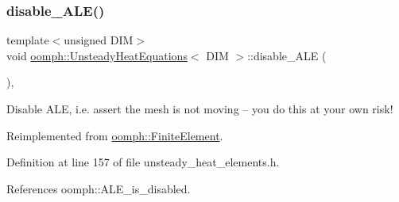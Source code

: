 \subsubsection{\texorpdfstring{disable\+\_\+\+A\+L\+E()}{disable\_ALE()}}
{\footnotesize\ttfamily template$<$unsigned D\+IM$>$ \\
void \hyperlink{classoomph_1_1UnsteadyHeatEquations}{oomph\+::\+Unsteady\+Heat\+Equations}$<$ D\+IM $>$\+::disable\+\_\+\+A\+LE (\begin{DoxyParamCaption}{ }\end{DoxyParamCaption})\hspace{0.3cm}{\ttfamily [inline]}, {\ttfamily [virtual]}}



Disable A\+LE, i.\+e. assert the mesh is not moving -- you do this at your own risk! 



Reimplemented from \hyperlink{classoomph_1_1FiniteElement_a625ea6d3f9baccfbdd1323315fb3ec71}{oomph\+::\+Finite\+Element}.



Definition at line 157 of file unsteady\+\_\+heat\+\_\+elements.\+h.



References oomph\+::\+A\+L\+E\+\_\+is\+\_\+disabled.

\mbox{\label{classoomph_1_1UnsteadyHeatEquations_aa6ab5a2e2bbf3830dfb17f8f2d1281b0}} 
